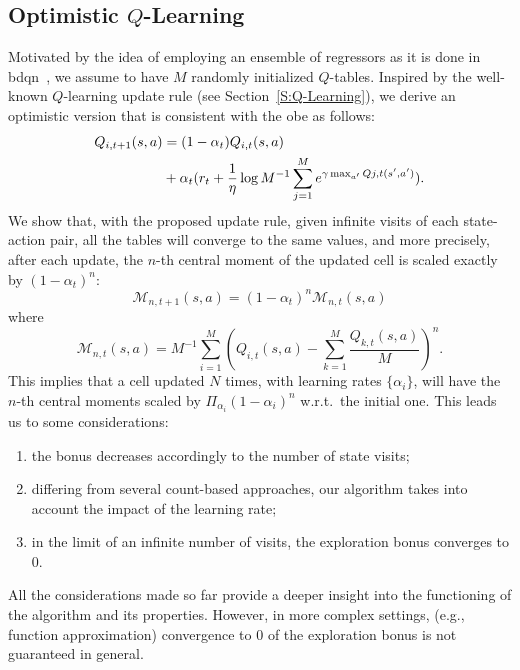 \subsection{Optimistic $Q$-Learning}
Motivated by the idea of employing an ensemble of regressors as it is done in \gls{bdqn}~\cite{osband2017deep}, we assume to have $M$ randomly initialized $Q$-tables. Inspired by the well-known $Q$-learning update rule (see Section~\ref{S:Q-Learning}), we derive an optimistic version that is consistent with the \gls{obe} as follows:
\begin{align*}
      \small  Q_{i, t+1}(s,a) &= (1-\alpha_t)Q_{i,t}(s,a)  \nonumber  \\
  & \small + \alpha_t (r_t + \frac{1}{\eta} \log M^{-1} \sum_{j=1}^M e^{\gamma \max_{a'} Q{j,t}(s', a')}).\nonumber
\end{align*}
\label{def:optimistic_qlearning}
We show that, with the proposed update rule, given infinite visits of each state-action pair, all the tables will converge to the same values, and more precisely, after each update, the $n$-th central moment of the updated cell is scaled exactly by $(1 - \alpha_t)^n$:
\begin{equation}
 \mathcal{M}_{n,t+1}(s,a) = (1-\alpha_t)^n \mathcal{M}_{n,t}(s,a) \label{momentdecreasing}
\end{equation}
where 
\begin{equation}
 \mathcal{M}_{n,t}(s,a) = M^{-1} \sum_{i=1}^M (Q_{i,t}(s,a) - \sum_{k=1}^M \frac{Q_{k,t}(s,a)}{M})^n. \nonumber
\end{equation}
This implies that a cell updated $N$ times, with learning rates $\{\alpha_i\}$, will have the $n$-th central moments scaled by $\Pi_{\alpha_i}(1-\alpha_i)^n$ w.r.t.\ the initial one. This leads us to some considerations:
\begin{enumerate}
 \item the bonus decreases accordingly to the number of state visits;
 \item differing from several count-based approaches, our algorithm takes into account the impact of the learning rate;
 \item in the limit of an infinite number of visits, the exploration bonus converges to $0$.
\end{enumerate}
All the considerations made so far provide a deeper insight into the functioning of the algorithm and its properties. However, in more complex settings, (e.g., function approximation) convergence to $0$ of the exploration bonus is not guaranteed in general.

